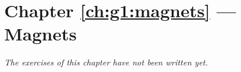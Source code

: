 \section*{Chapter \ref{ch:g1:magnets} --- Magnets}


\emph{The exercises of this chapter have not been written yet.}

